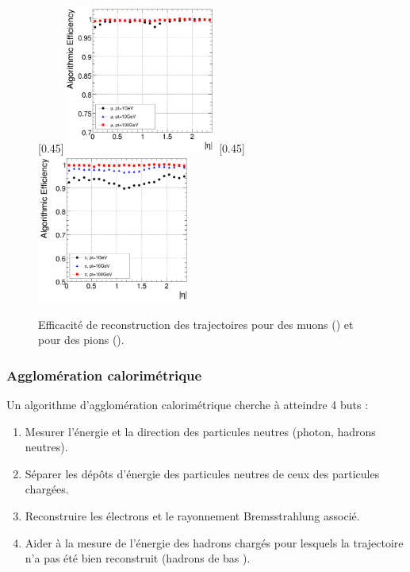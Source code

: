\begin{figure} \centering
  \subcaptionbox{\label{fig:tracking_eff_mu}}[0.45\textwidth]{\includegraphics[width=0.45\textwidth]{chapitre3/figs/iterative_tracking_mu.pdf}}\hfill
  \subcaptionbox{\label{fig:tracking_eff_pi}}[0.45\textwidth]{\includegraphics[width=0.45\textwidth]{chapitre3/figs/iterative_tracking_pi.pdf}}
  \caption{Efficacité de reconstruction des trajectoires pour des muons () et pour des pions ().}
  \label{fig:iterative_tracking_eff}
\end{figure}

\subsubsection{Agglomération calorimétrique}

Un algorithme d'agglomération calorimétrique cherche à atteindre 4 buts : 
\begin{enumerate}
  \item Mesurer l'énergie et la direction des particules neutres (photon, hadrons neutres).
  \item Séparer les dépôts d'énergie des particules neutres de ceux des particules chargées.
  \item Reconstruire les électrons et le rayonnement Bremsstrahlung associé.
  \item Aider à la mesure de l'énergie des hadrons chargés pour lesquels la trajectoire n'a pas été bien reconstruit (hadrons de bas \pt).
\end{enumerate}

